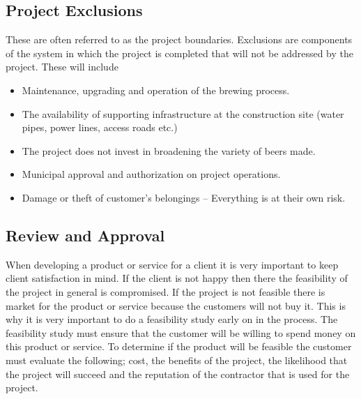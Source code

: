 \subsection{Project Exclusions}
These are often referred to as the project boundaries. Exclusions are components of the system in which the project is completed that will not be addressed by the project. These will include\\
\begin{itemize}
\item	Maintenance, upgrading and operation of the brewing process.
\item	The availability of supporting infrastructure at the construction site (water pipes, power lines, access roads etc.)
\item	The project does not invest in broadening the variety of beers made.
\item	Municipal approval and authorization on project operations.
\item	Damage or theft of customer’s belongings – Everything is at their own risk.
\end{itemize}


\subsection{Review and Approval} 

When developing a product or service for a client it is very important to keep client satisfaction in mind. If the client is not happy then there the feasibility of the project in general is compromised. If the project is not feasible there is market for the product or service because the customers will not buy it. This is why it is very important to do a feasibility study early on in the process. The feasibility study must ensure that the customer will be willing to spend money on this product or service. To determine if the product will be feasible the customer must evaluate the following; cost, the benefits of the project, the likelihood that the project will succeed and the reputation of the contractor that is used for the project.\\

